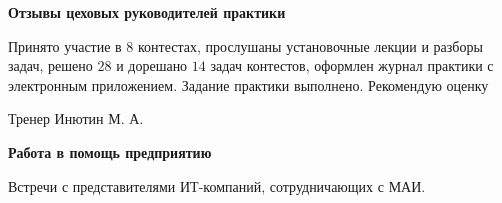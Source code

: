 \begin{center}
    \bfseries{\large Отзывы цеховых руководителей практики}
    \end{center}
    
    Принято участие в $8$ контестах, прослушаны установочные лекции и разборы задач, решено $28$ и дорешано $14$ задач контестов, оформлен журнал практики с электронным приложением. Задание практики выполнено. Рекомендую оценку
    
    \vspace{15pt}
    
    \hfill Тренер Инютин М. А. 
    
    \vspace{200pt}
    
    \begin{center}
    \bfseries{\large Работа в помощь предприятию}
    \end{center}
    
    Встречи с представителями ИТ-компаний, сотрудничающих с МАИ.
    
    \pagebreak